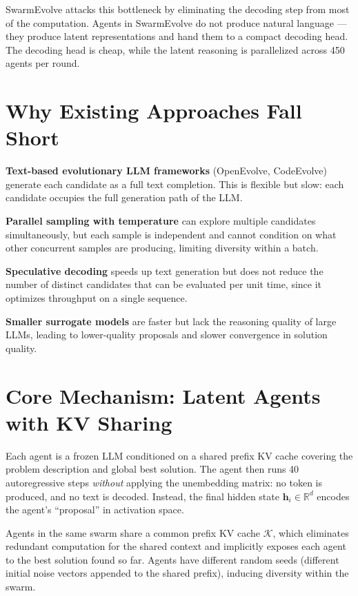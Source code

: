 \documentclass[10pt,twocolumn]{article}
\begin{document}
SwarmEvolve attacks this bottleneck by eliminating the decoding step
from most of the computation. Agents in SwarmEvolve do not produce
natural language --- they produce latent representations and hand them
to a compact decoding head. The decoding head is cheap, while the
latent reasoning is parallelized across 450 agents per round.

\section{Why Existing Approaches Fall Short}

\textbf{Text-based evolutionary LLM frameworks} (OpenEvolve, CodeEvolve)
generate each candidate as a full text completion. This is flexible but
slow: each candidate occupies the full generation path of the LLM.

\textbf{Parallel sampling with temperature} can explore multiple
candidates simultaneously, but each sample is independent and cannot
condition on what other concurrent samples are producing, limiting
diversity within a batch.

\textbf{Speculative decoding} speeds up text generation but does not
reduce the number of distinct candidates that can be evaluated per unit
time, since it optimizes throughput on a single sequence.

\textbf{Smaller surrogate models} are faster but lack the reasoning
quality of large LLMs, leading to lower-quality proposals and slower
convergence in solution quality.

\section{Core Mechanism: Latent Agents with KV Sharing}

Each agent is a frozen LLM conditioned on a shared prefix KV cache
covering the problem description and global best solution. The agent
then runs 40 autoregressive steps \emph{without} applying the
unembedding matrix: no token is produced, and no text is decoded.
Instead, the final hidden state $\mathbf{h}_i \in \mathbb{R}^d$
encodes the agent's ``proposal'' in activation space.

Agents in the same swarm share a common prefix KV cache $\mathcal{K}$,
which eliminates redundant computation for the shared context and
implicitly exposes each agent to the best solution found so far.
Agents have different random seeds (different initial noise vectors
appended to the shared prefix), inducing diversity within the swarm.
\end{document}
